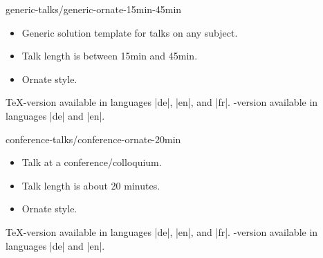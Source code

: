 \begin{solution}{generic-talks/generic-ornate-15min-45min}
  \begin{itemize}
  \item
    Generic solution template for talks on any subject.
  \item
    Talk length is between 15min and 45min.
  \item
    Ornate style.
  \end{itemize}
  \beamernote \TeX-version available in languages |de|, |en|, and |fr|.
  \lyxnote    \LyX-version available in languages |de| and |en|.
\end{solution}

\begin{solution}{conference-talks/conference-ornate-20min}
  \begin{itemize}
  \item
    Talk at a conference/colloquium.
  \item
    Talk length is about 20 minutes.
  \item
    Ornate style.
  \end{itemize}
  \beamernote \TeX-version available in languages |de|, |en|, and |fr|.
  \lyxnote    \LyX-version available in languages |de| and |en|.
\end{solution}

